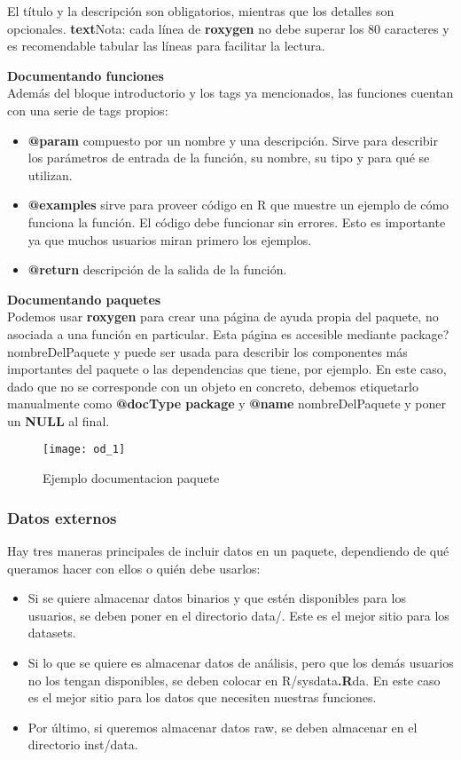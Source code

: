 El t\'itulo y la descripci\'on son obligatorios, mientras que los detalles son opcionales.
\textbf{text}{Nota}: cada l\'inea de \textbf{roxygen} no debe superar los 80 caracteres y es recomendable tabular
las l\'ineas para facilitar la lectura.

\textbf{Documentando funciones} \\
Adem\'as del bloque introductorio y los tags ya mencionados, las funciones cuentan con una
serie de tags propios:
\begin{itemize}
    \item \textbf{@param} compuesto por un nombre y una descripci\'on. Sirve para describir los
par\'ametros de entrada de la funci\'on, su nombre, su tipo y para qu\'e se utilizan.
    \item \textbf{@examples} sirve para proveer c\'odigo en R que muestre un ejemplo de c\'omo funciona
la funci\'on. El c\'odigo debe funcionar sin errores. Esto es importante ya que muchos
usuarios miran primero los ejemplos.
    \item \textbf{@return} descripci\'on de la salida de la funci\'on.
\end{itemize}

\textbf{Documentando paquetes}\\

Podemos usar \textbf{roxygen} para crear una p\'agina de ayuda propia del paquete, no asociada a
una funci\'on en particular. Esta p\'agina es accesible mediante package?nombreDelPaquete y
puede ser usada para describir los componentes m\'as importantes del paquete o las
dependencias que tiene, por ejemplo.
En este caso, dado que no se corresponde con un objeto en concreto, debemos etiquetarlo
manualmente como \textbf{@docType package} y \textbf{@name} nombreDelPaquete y poner un \textbf{NULL} al
final.

\begin{figure}[H]
    \centering
    \texttt{[image: od\_1]}
    \caption{Ejemplo documentacion paquete }
    \label{fig:paquete}
\end{figure} 

\subsubsection{Datos externos}

Hay tres maneras principales de incluir datos en un paquete, dependiendo de qu\'e queramos
hacer con ellos o qui\'en debe usarlos:

\begin{itemize}
    \item Si se quiere almacenar datos binarios y que est\'en disponibles para los usuarios, se
deben poner en el directorio data/. Este es el mejor sitio para los datasets.
    \item Si lo que se quiere es almacenar datos de an\'alisis, pero que los dem\'as usuarios no
los tengan disponibles, se deben colocar en R/sysdata\textbf{.R}da. En este caso es el mejor
sitio para los datos que necesiten nuestras funciones.
    \item Por \'ultimo, si queremos almacenar datos raw, se deben almacenar en el directorio
inst/data.
\end{itemize}

